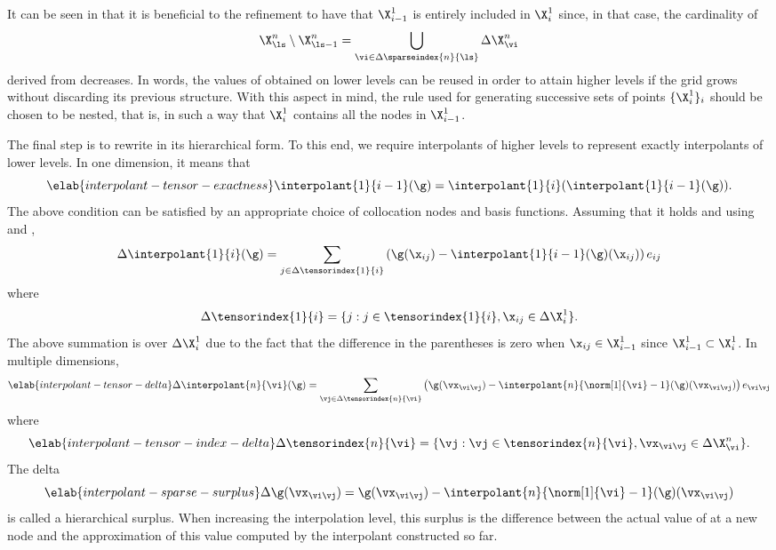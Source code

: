 It can be seen in  that it is beneficial to the
refinement to have that $\X^1_{i - 1}$ is entirely included in $\X^1_i$ since,
in that case, the cardinality of
\[
  \X^n_{\ls} \setminus \X^n_{\ls - 1} = \bigcup_{\vi \in \Delta\sparseindex{n}{\ls}} \Delta\X^n_{\vi}
\]
derived from  decreases. In words, the values of
\g obtained on lower levels can be reused in order to attain higher levels if
the grid grows without discarding its previous structure. With this aspect in
mind, the rule used for generating successive sets of points $\{ \X^1_i \}_i$
should be chosen to be nested, that is, in such a way that $\X^1_i$ contains all
the nodes in $\X^1_{i - 1}$.

The final step is to rewrite  in its
hierarchical form. To this end, we require interpolants of higher levels to
represent exactly interpolants of lower levels. In one dimension, it means that
\begin{equation} \elab{interpolant-tensor-exactness}
  \interpolant{1}{i - 1}(\g) = \interpolant{1}{i}(\interpolant{1}{i - 1}(\g)).
\end{equation}
The above condition can be satisfied by an appropriate choice of collocation
nodes and basis functions. Assuming that it holds and using
 and ,
\[
  \Delta\interpolant{1}{i}(\g) = \sum_{j \in \Delta\tensorindex{1}{i}} \left(\g(\x_{ij}) - \interpolant{1}{i - 1}(\g)(\x_{ij})\right) e_{ij}
\]
where
\[
  \Delta\tensorindex{1}{i} = \{ j: j \in \tensorindex{1}{i}, \x_{ij} \in \Delta\X^1_i \}.
\]
The above summation is over $\Delta\X^1_i$ due to the fact that the difference
in the parentheses is zero when $\x_{ij} \in \X^1_{i - 1}$ since $\X^1_{i - 1}
\subset \X^1_i$. In multiple dimensions,
\begin{equation} \elab{interpolant-tensor-delta}
  \Delta\interpolant{n}{\vi}(\g) = \sum_{\vj \in \Delta\tensorindex{n}{\vi}} \left(\g(\vx_{\vi \vj}) - \interpolant{n}{\norm[1]{\vi} - 1}(\g)(\vx_{\vi \vj})\right) e_{\vi \vj}
\end{equation}
where
\begin{equation} \elab{interpolant-tensor-index-delta}
  \Delta\tensorindex{n}{\vi} = \{ \vj: \vj \in \tensorindex{n}{\vi}, \vx_{\vi \vj} \in \Delta\X^n_{\vi} \}.
\end{equation}
The delta
\begin{equation} \elab{interpolant-sparse-surplus}
  \Delta\g(\vx_{\vi \vj}) = \g(\vx_{\vi \vj}) - \interpolant{n}{\norm[1]{\vi} - 1}(\g)(\vx_{\vi \vj})
\end{equation}
is called a hierarchical surplus. When increasing the interpolation level, this
surplus is the difference between the actual value of \g at a new node and the
approximation of this value computed by the interpolant constructed so far.

